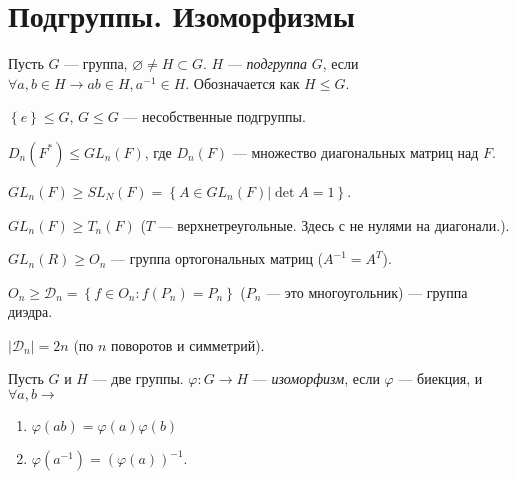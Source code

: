 \section{Подгруппы. Изоморфизмы}

\begin{define*}
  Пусть $G$ --- группа, $\varnothing \neq H \subset G$. $H$ --- \emph{подгруппа} $G$, если $\forall a, b \in H \to ab \in H, a^{-1} \in H$. 
  Обозначается как $H \leqslant G$.
\end{define*}

\begin{define*}
  $\left\{ e \right\} \leqslant G$, $G \leqslant G$ --- несобственные подгруппы.
\end{define*}

\begin{example}
  $D_n(F^*) \leqslant GL_n(F)$, где $D_n(F)$ --- множество диагональных матриц над $F$.
\end{example}

\begin{example}
  $GL_n(F) \geqslant SL_N(F) = \left\{ A \in GL_n(F) | \det{A} = 1 \right\}$.
\end{example}

\begin{exercise}
  $GL_n(F) \geqslant T_n(F)$ ($T$ --- верхнетреугольные. Здесь с не нулями на диагонали.).
\end{exercise}

\begin{example}
  $GL_n(R)	\geqslant O_n$ --- группа ортогональных матриц ($A^{-1} = A^T$).
\end{example}

\begin{example}
  $O_n \geqslant \mathcal{D}_n = \left\{ f \in O_n: f(P_n) = P_n \right\}$ ($P_n$ --- это многоугольник) --- группа диэдра.
\end{example}

\begin{exercise}
  $|\mathcal{D}_n| = 2n$ (по $n$ поворотов и симметрий).
\end{exercise}

\begin{define*}
  Пусть $G$ и $H$ --- две группы. $\varphi: G\to H$ --- \emph{изоморфизм}, если $\varphi$ --- биекция, и $\forall a, b \to$
  \begin{enumerate}
	\item $\varphi(ab) = \varphi(a)\varphi(b)$
	\item $\varphi(a^{-1}) = (\varphi(a))^{-1}$.
  \end{enumerate}
\end{define*}

